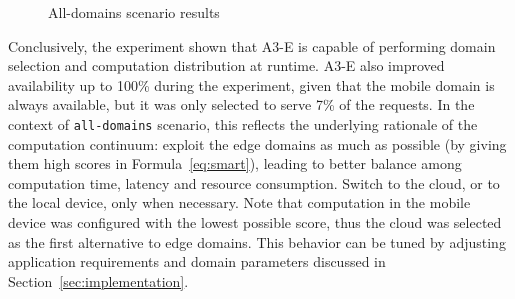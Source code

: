 \begin{figure}[htb]
\centering
	\captionsetup[subfigure]{width=0.3\textwidth}
	\captionsetup[subfigure]{width=0.3\textwidth}
	\captionsetup[subfigure]{width=0.3\textwidth}
	
	\caption{All-domains scenario results} \label{fig:all-domains}
\end{figure}

Conclusively, the experiment shown that A3-E is capable of performing domain selection and computation distribution at runtime. A3-E also improved availability up to 100\% during the experiment, given that the mobile domain is always available, but it was only selected to serve 7\% of the requests.
In the context of \texttt{all-domains} scenario, this reflects the underlying rationale of the computation continuum: exploit the edge domains as much as possible (by giving them high scores in Formula~\ref{eq:smart}), leading to better balance among computation time, latency and resource consumption. Switch to the cloud, or to the local device, only when necessary. Note that computation in the mobile device was configured with the lowest possible score, thus the cloud was selected as the first alternative to edge domains. This behavior can be tuned by adjusting application requirements and domain parameters discussed in Section~\ref{sec:implementation}.


